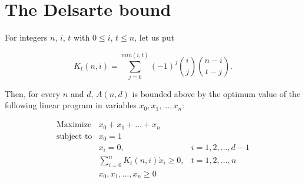 \section{The Delsarte bound}
\begin{theorem}
    For integers $n$, $i$, $t$ with $0 \leq i$, $t \leq n$, let us put

    \begin{equation}
        K_t(n,i) = \sum_{j=0}^{min(i,t)}(-1)^j{i \choose j}{n - i \choose t - j}.
    \end{equation}

    Then, for every $n$ and $d$, $A(n,d)$ is bounded above by the optimum value of the following linear program in variables $x_0, x_1, \ldots, x_n$:

    \begin{equation}
        \begin{array}{lll}
            \text{Maximize}   & x_0 + x_1 + \ldots + x_n                       &                  \\
            \text{subject to} & x_0 = 1                                        &                  \\
                              & x_i = 0,                                       & i=1,2,\ldots,d-1 \\
                              & \sum\limits_{i=0}^{n}K_t(n,i) \dot x_i \geq 0, & t=1,2,\ldots,n   \\
                              & x_0, x_1, \ldots, x_n \geq 0                   &                  \\
        \end{array}
    \end{equation}
\end{theorem}



